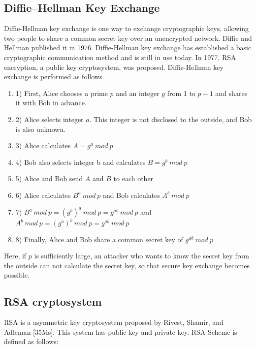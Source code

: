 \documentclass[a4paper]{article}
\begin{document}
\subsection*{Diffie–Hellman Key Exchange}
Diffie-Hellman key exchange \cite{diffie} is one way to exchange cryptographic keys, allowing two people to share a common secret key over an unencrypted network. Diffie and Hellman published it in 1976. Diffie-Hellman key exchange has established a basic cryptographic communication method and is still in use today. In 1977, RSA encryption, a public key cryptosystem, was proposed. Diffie-Hellman key exchange is performed as follows.
\begin{enumerate}[label=]
      \item 1) First, Alice chooses a prime $p$ and an integer $g$ from 1 to $p-1$ and shares it with Bob in advance. 
      
      \item 2) Alice selects integer $a$. This integer is not disclosed to the outside, and Bob is also unknown.
      
      \item 3) Alice calculates $A = g^{a}\ mod\ p$
      \item 4) Bob also selects integer b and calculates $B = g^{b}\ mod\ p$
      \item 5) Alice and Bob send $A$ and $B$ to each other
      \item 6) Alice calculates $B^{a}\ mod\ p$ and Bob calculates $A^{b}\ mod\ p$
      \item 7) $B^a\ mod\ p = (g^b)^a\ mod\ p = g^{ab}\ mod\ p$ and $A^b\ mod\ p = (g^a)^b\ mod\ p = g^{ab}\ mod\ p$
      \item 8) Finally, Alice and Bob share a common secret key of $g^{ab}\ mod\ p$
\end{enumerate}
Here, if $p$ is sufficiently large, an attacker who wants to know the secret key from the outside can not calculate the secret key, so that secure key exchange becomes possible.


\subsection {RSA cryptosystem}
RSA is a asymmetric key cryptosystem proposed by Rivest, Shamir, and Adleman [35Ms]. This system has public key and private key. RSA Scheme is defined as follows:
\end{document}
